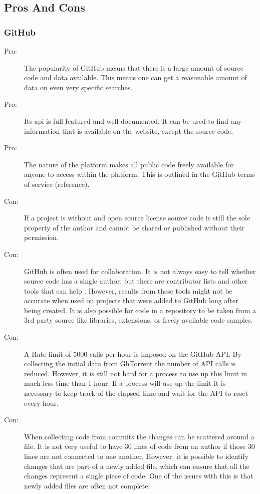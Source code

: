 \documentclass[12pt]{article}
\begin{document}
\subsection{Pros And Cons}
\subsubsection*{GitHub}
\begin{description}
    \item [Pro:] The popularity of GitHub means that there is a large amount of source code and data available. This means one can get a reasonable amount of data on even very specific searches.

    \item [Pro:] Its api is full featured and well documented. It can be used to find any information that is available on the website, except the source code.
    
    \item [Pro:] The nature of the platform makes all public code freely available for anyone to access within the platform. This is outlined in the GitHub terms of service (reference).
    
    \item [Con:] If a project is without and open source license source code is still the sole property of the author and cannot be shared or published without their permission.

    \item [Con:] GitHub is often used for collaboration. It is not always easy to tell whether source code has a single author, but there are contributor lists and other tools that can help \cite{Yang2017}\cite{Matyukhina2019}. However, results from these tools might not be accurate when used on projects that were added to GitHub long after being created. It is also possible for code in a repository to be taken from a 3rd party source like libraries, extensions, or freely available code samples.

    \item [Con:] A Rate limit of 5000 calls per hour is imposed on the GitHub API. By collecting the initial data from GhTorrent the number of API calls is reduced. However, it is still not hard for a process to use up this limit in much less time than 1 hour. If a process will use up the limit it is necessary to keep track of the elapsed time and wait for the API to reset every hour.

    \item [Con:] When collecting code from commits the changes can be scattered around a file. It is not very useful to have 30 lines of code from an author if those 30 lines are not connected to one another. However, it is possible to identify changes that are part of a newly added file, which can ensure that all the changes represent a single piece of code. One of the issues with this is that newly added files are often not complete.
\end{description}
\end{document}
